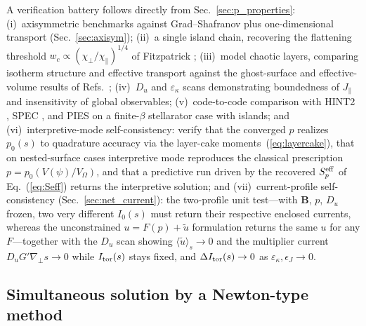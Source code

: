\documentclass[english]{article}
\newcommand{\bB}{\mathbf{B}}
\newcommand{\gradperp}{\nabla_{\!\perp}}
\begin{document}
A verification battery follows directly from Sec.~\ref{sec:p_properties}: (i)~axisymmetric
benchmarks against Grad--Shafranov plus one-dimensional transport (Sec.~\ref{sec:axisym}); (ii)~a single island chain,
recovering the flattening threshold $w_c\propto(\chi_\perp/\chi_\parallel)^{1/4}$ of Fitzpatrick
\cite{fitzpatrick1995}; (iii)~model chaotic layers, comparing isotherm structure and effective
transport against the ghost-surface and effective-volume results of
Refs.~\cite{hudson2008,helander2022,paul2022}; (iv)~$D_u$ and $\varepsilon_\kappa$ scans
demonstrating boundedness of $J_\parallel$ and insensitivity of global observables;
(v)~code-to-code comparison with HINT2 \cite{suzuki2006}, SPEC \cite{hudson2012}, and PIES
\cite{reiman1986} on a finite-$\beta$ stellarator case with islands; and (vi)~interpretive-mode
self-consistency: verify that the converged $p$ realizes $p_0(s)$ to quadrature accuracy via the
layer-cake moments~(\ref{eq:layercake}), that on nested-surface cases interpretive mode reproduces
the classical prescription $p=p_0(V(\psi)/V_\Omega)$, and that a predictive run driven by the recovered
$S_p^{\rm eff}$ of Eq.~(\ref{eq:Seff}) returns the interpretive solution; and (vii)~current-profile
self-consistency (Sec.~\ref{sec:net_current}): the two-profile unit test---with $\bB$, $p$, $D_u$
frozen, two very different $I_0(s)$ must return their respective enclosed currents, whereas the
unconstrained $u=F(p)+\tilde u$ formulation returns the same $u$ for any $F$---together with the
$D_u$ scan showing $\langle\tilde u\rangle_s\rightarrow0$ and the multiplier current
$D_uG'\gradperp s\rightarrow0$ while $I_{\rm tor}(s)$ stays fixed, and $\Delta I_{\rm tor}(s)
\rightarrow0$ as $\varepsilon_\kappa,\epsilon_J\rightarrow0$.

\subsection{Simultaneous solution by a Newton-type method}
\label{sec:newton}
\end{document}
